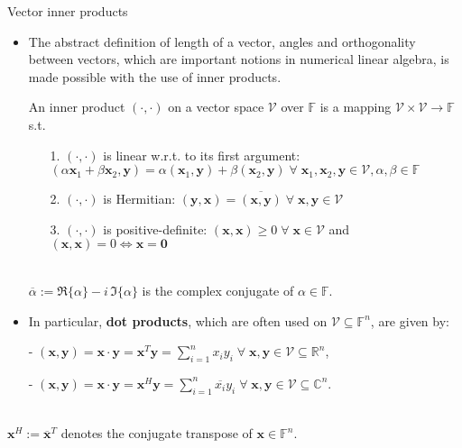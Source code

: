 \documentclass[t,usepdftitle=false]{beamer}
\begin{document}
\begin{frame}{Vector inner products}
\begin{itemize}
\item The abstract definition of length of a vector, angles and orthogonality between vectors, which are important notions in numerical linear algebra, is made possible with the use of inner products.
\begin{definition}
An inner product $(\cdot,\cdot)$ on a vector space $\mathcal{V}\!$ over $\mathbb{F}$ is a mapping $\mathcal{V}\!\times\!\mathcal{V}\!\rightarrow\mathbb{F}$ s.t.\\
\begin{enumerate}
\item[1.] $(\cdot,\cdot)$ is linear w.r.t. $\!$to its first argument:\\
\hfill$(\alpha\mathbf{x}_1+\beta\mathbf{x}_2,\mathbf{y})
=\alpha(\mathbf{x}_1,\mathbf{y})+\beta(\mathbf{x}_2,\mathbf{y})
\;\forall\;
\mathbf{x}_1,\mathbf{x}_2,\mathbf{y}\in\mathcal{V},\alpha,\beta\in\mathbb{F}$
\item[2.] $(\cdot,\cdot)$ is Hermitian:
\hfill$(\mathbf{y},\mathbf{x})=\overline{(\mathbf{x},\mathbf{y})}
\;\forall\;
\mathbf{x},\mathbf{y}\in \mathcal{V}$
\item[3.] $(\cdot,\cdot)$ is positive-definite:
\hfill$(\mathbf{x},\mathbf{x})\geq 0\;\forall\;\mathbf{x}\in \mathcal{V}$ and $(\mathbf{x},\mathbf{x})=0\iff \mathbf{x}=\boldsymbol{0}$
\end{enumerate}
\end{definition}
~\vspace*{-.65cm}\\
{\scriptsize{$\overline{\alpha}:=\Re\{\alpha\}-i\,\Im\{\alpha\}$ is the complex conjugate of $\alpha\in\mathbb{F}$.}}
\item In particular, \textbf{dot products}, which are often used on $\mathcal{V}\subseteq\mathbb{F}^n$, are given by:
\end{itemize}
\begin{itemize}
\centering
\item[-] $(\mathbf{x},\mathbf{y})=\mathbf{x}\cdot\mathbf{y}=\mathbf{x}^T\mathbf{y}=\sum_{i=1}^nx_iy_i\;\forall\;\mathbf{x},\mathbf{y}\in \mathcal{V}\subseteq\mathbb{R}^n$,\smallskip
\item[-] $(\mathbf{x},\mathbf{y})=\mathbf{x}\cdot\mathbf{y}=\mathbf{x}^H\mathbf{y}=\sum_{i=1}^n\overline{x_i}y_i\;\forall\;\mathbf{x},\mathbf{y}\in \mathcal{V}\subseteq\mathbb{C}^n$.
\end{itemize}
~\vspace*{-.45cm}\\
{\hspace{.42cm}\scriptsize{$\mathbf{x}^H:=\overline{\mathbf{x}}^T$ denotes the conjugate transpose of $\mathbf{x}\in\mathbb{F}^n$.}}
\end{frame}
\end{document}
